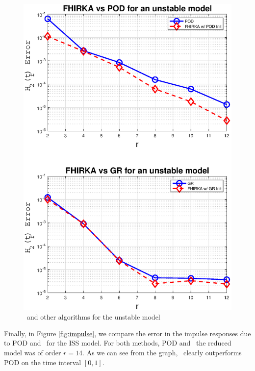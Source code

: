 \documentclass[twocolumn]{autart}
\begin{document}
  \begin{figure}[H]
 \centering
   \includegraphics [scale=0.35]{fig3u}
      \caption{\FH \ and other algorithms for the unstable model \label{fig:uns}}
 \end{figure}
 
Finally, in Figure \ref{fig:impulse}, we compare the error in the impulse responses due to POD and \FH \ for the ISS model. For both methods, POD and \FH\  the reduced model was of order $r=14$. As we can see from the graph, \FH \ clearly outperforms POD on the time interval $[0, 1]$.
\end{document}
